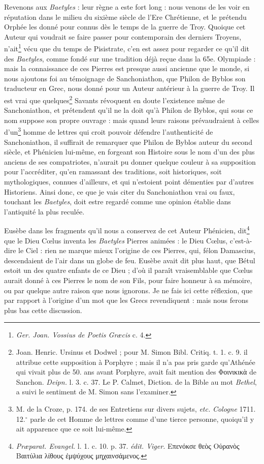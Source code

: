 \documentclass[a4paper, 11pt, oneside, polutonikogreek, french]{article}
\begin{document}
Revenons aux \emph{Baetyles} : leur règne a este fort long : nous venons de les voir en réputation dans le milieu du sixième siècle de l'Ere Chrétienne, et le prétendu Orphée les donné pour connus dès le temps de la guerre de Troy. Quoique cet Auteur qui voudrait se faire passer pour contemporain des derniers Troyens, n'ait\footnote{\emph{Ger. Joan. Vossius de Poetis Græcis} c. 4.} vécu que du temps de Pisistrate, c'en est assez pour regarder ce qu'il dit des \emph{Baetyles}, comme fondé sur une tradition déjà reçue dans la 65e. Olympiade : mais la connaissance de ces Pierres est presque aussi ancienne que le monde, si nous ajoutons foi au témoignage de Sanchoniathon, que Philon de Byblos son traducteur en Grec, nous donné pour un Auteur antérieur à la guerre de Troy. Il est vrai que quelques\footnote{Joan. Henric. Ursinus et Dodwel ; pour M. Simon Bibl. Critiq. t. 1. c. 9. il attribue cette supposition à Porphyre ; mais il n'a pas pris garde qu'Athénée qui vivait plus de 50. ans avant Porphyre, avait fait mention des Φοινικικὰ de Sanchon. \emph{Deipn.} l. 3. c. 37. Le P. Calmet, Diction. de la Bible au mot \emph{Bethel}, a suivi le sentiment de M. Simon sans l'examiner.} Savants révoquent en doute l'existence même de Sanchoniathon, et prétendent qu'il ne la doit qu'à Philon de Byblos, qui sous ce nom suppose son propre ouvrage : mais quand leurs raisons prévaudraient à celles d'un\footnote{M. de la Croze, p. 174. de ses Entretiens sur divers sujets, \emph{etc.} \emph{Cologne} 1711. 12.$^\circ$ parle de cet Homme de lettres comme d'une tierce personne, quoiqu’il y ait apparence que ce soit lui-même.} homme de lettres qui croit pouvoir défendre l'authenticité de Sanchoniathon, il suffirait de remarquer que Philon de Byblos auteur du second siècle, et Phénicien lui-même, en forgeant son Histoire sous le nom d'un des plus anciens de ses compatriotes, n'aurait pu donner quelque couleur à sa supposition pour l'accréditer, qu'en ramassant des traditions, soit historiques, soit mythologiques, connues d'ailleurs, et qui n'estoient point démenties par d'autres Historiens. Ainsi donc, ce que je vais citer du Sanchoniathon vrai ou faux, touchant les \emph{Baetyles}, doit estre regardé comme une opinion établie dans l'antiquité la plus reculée.

Eusèbe dans les fragments qu'il nous a conservez de cet Auteur Phénicien, dit\footnote{\emph{Præparat. Evangel.} l. 1. c. 10. p. 37. \emph{édit. Viger.} Επενόκσε θεὸς Οὑρανὸς Βαιτύλια λίθους ἐμψύχους μηχαινσάμενος.} que le Dieu Cœlus inventa les \emph{Baetyles} Pierres animées : le Dieu Cœlus, c'est-à-dire le Ciel : rien ne marque mieux l'origine de ces Pierres, qui, félon Damascius, descendaient de l'air dans un globe de feu. Eusèbe avait dit plus haut, que Bétul estoit un des quatre enfants de ce Dieu ; d'où il paraît vraisemblable que Cœlus aurait donné à ces Pierres le nom de son Fils, pour faire honneur à sa mémoire, ou par quelque autre raison que nous ignorons. Je ne fais ici cette réflexion, que par rapport à l'origine d'un mot que les Grecs revendiquent : mais nous ferons plus bas cette discussion.
\end{document}

